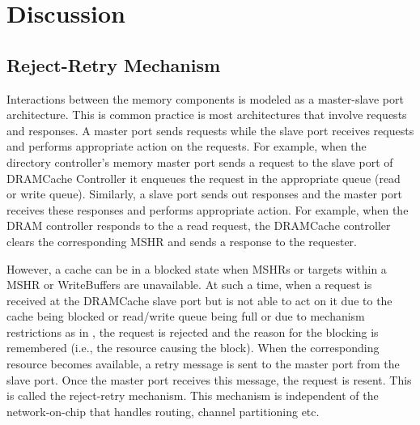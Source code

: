 \section{Discussion}
\subsection{Reject-Retry Mechanism}
Interactions between the memory components is modeled as a master-slave port architecture. This is common practice is most architectures that involve requests and responses. A master port sends requests while the slave port receives requests and performs appropriate action on the requests. For example, when the directory controller's memory master port sends a request to the slave port of DRAMCache Controller it enqueues the request in the appropriate queue (read or write queue). Similarly, a slave port sends out responses and the master port receives these responses and performs appropriate action. For example, when the DRAM controller responds to the a read request, the DRAMCache controller clears the corresponding MSHR and sends a response to the requester.
\par However, a cache can be in a blocked state when MSHRs or targets within a MSHR or WriteBuffers are unavailable. At such a time, when a request is received at the DRAMCache slave port but is not able to act on it due to the cache being blocked or read/write queue being full or due to mechanism restrictions as in \prioname, the request is rejected and the reason for the blocking is remembered (i.e., the resource causing the block). When the corresponding resource becomes available, a retry message is sent to the master port from the slave port. Once the master port receives this message, the request is resent. This is called the reject-retry mechanism. This mechanism is independent of the network-on-chip that handles routing, channel partitioning etc.

